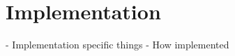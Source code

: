 
\chapter{Implementation} \label{implementation}

- Implementation specific things
- How implemented